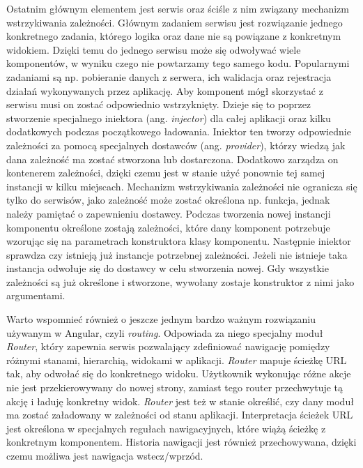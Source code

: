 Ostatnim głównym elementem jest serwis oraz ściśle z nim związany mechanizm wstrzykiwania zależności. Głównym zadaniem serwisu jest rozwiązanie jednego konkretnego zadania, którego logika oraz dane nie są powiązane z konkretnym widokiem. Dzięki temu do jednego serwisu może się odwoływać wiele komponentów, w wyniku czego nie powtarzamy tego samego kodu. Popularnymi zadaniami są np. pobieranie danych z serwera, ich walidacja oraz rejestracja działań wykonywanych przez aplikację\cite{ANG03}. Aby komponent mógł skorzystać z serwisu musi on zostać odpowiednio wstrzyknięty. Dzieje się to poprzez stworzenie specjalnego iniektora (ang. \textit{injector}) dla całej aplikacji oraz kilku dodatkowych podczas początkowego ładowania. Iniektor ten tworzy odpowiednie zależności za pomocą specjalnych dostawców (ang. \textit{provider}), którzy wiedzą jak dana zależność ma zostać stworzona lub dostarczona. Dodatkowo zarządza on kontenerem zależności, dzięki czemu jest w stanie użyć ponownie tej samej instancji w kilku miejscach. Mechanizm wstrzykiwania zależności nie ogranicza się tylko do serwisów, jako zależność może zostać określona np. funkcja, jednak należy pamiętać o zapewnieniu dostawcy. Podczas tworzenia nowej instancji komponentu określone zostają zależności, które dany komponent potrzebuje wzorując się na parametrach konstruktora klasy komponentu. Następnie iniektor sprawdza czy istnieją już instancje potrzebnej zależności. Jeżeli nie istnieje taka instancja odwołuje się do dostawcy w celu stworzenia nowej. Gdy wszystkie zależności są już określone i stworzone, wywołany zostaje konstruktor z nimi jako argumentami.


Warto wspomnieć również o jeszcze jednym bardzo ważnym rozwiązaniu używanym w \mbox{Angular}, czyli \textit{routing}. Odpowiada za niego specjalny moduł \textit{Router}, który zapewnia serwis pozwalający zdefiniować nawigację pomiędzy różnymi stanami, hierarchią, widokami w aplikacji. \textit{Router} mapuje ścieżkę URL tak, aby odwołać się do konkretnego widoku. Użytkownik wykonując różne akcje nie jest przekierowywany do nowej strony, zamiast tego router przechwytuje tą akcję i ładuję konkretny widok. \textit{Router} jest też w stanie określić, czy dany moduł ma zostać załadowany w zależności od stanu aplikacji. Interpretacja ścieżek URL jest określona w specjalnych regułach nawigacyjnych, które wiążą ścieżkę z konkretnym komponentem. Historia nawigacji jest również przechowywana, dzięki czemu możliwa jest nawigacja wstecz/wprzód.


